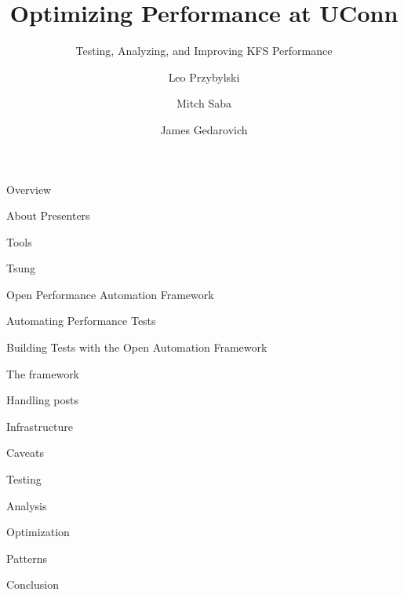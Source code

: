 \documentclass[xcolor=dvipsnames,14pt]{beamer}
\begin{document}
\title[A short proof]{Optimizing Performance at UConn}
\subtitle[Errors]{Testing, Analyzing, and Improving KFS Performance}
\author[Leo]{Leo Przybylski  \and Mitch Saba  \and James Gedarovich }



\begin{frame}[plain]
  \titlepage
\end{frame}

\begin{frame}{Overview}
\end{frame}

\begin{frame}{About Presenters}
\end{frame}

\begin{frame}{Tools}
  \item Tsung
  \item Open Performance Automation Framework
\end{frame}

\begin{frame}{Automating Performance Tests}

\end{frame}

\begin{frame}{Building Tests with the Open Automation Framework}
  \item The framework
  \item Handling posts
\end{frame}

\begin{frame}{Infrastructure}
\end{frame}

\begin{frame}{Caveats}
\end{frame}

\begin{frame}{Testing}
\end{frame}

\begin{frame}{Analysis}
\end{frame}

\begin{frame}{Optimization}
\end{frame}

\begin{frame}{Patterns}
\end{frame}

\begin{frame}{Conclusion}
\end{frame}
\end{document}
